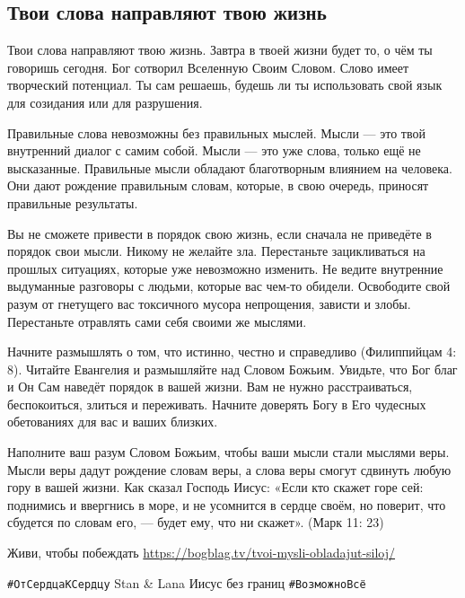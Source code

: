  
 
 
 
 

\subsection{Твои слова направляют твою жизнь}

Твои слова направляют твою жизнь. Завтра в твоей жизни будет то, о чём ты
говоришь сегодня. Бог сотворил Вселенную Своим Словом. Слово имеет творческий
потенциал. Ты сам решаешь, будешь ли ты использовать свой язык для созидания
или для разрушения.

Правильные слова невозможны без правильных мыслей. Мысли — это твой внутренний
диалог с самим собой. Мысли — это уже слова, только ещё не высказанные.
Правильные мысли обладают благотворным влиянием на человека. Они дают рождение
правильным словам, которые, в свою очередь, приносят правильные результаты.

Вы не сможете привести в порядок свою жизнь, если сначала не приведёте в
порядок свои мысли. Никому не желайте зла. Перестаньте зацикливаться на прошлых
ситуациях, которые уже невозможно изменить. Не ведите внутренние выдуманные
разговоры с людьми, которые вас чем-то обидели. Освободите свой разум от
гнетущего вас токсичного мусора непрощения, зависти и злобы. Перестаньте
отравлять сами себя своими же мыслями.

Начните размышлять о том, что истинно, честно и справедливо (Филиппийцам 4: 8).
Читайте Евангелия и размышляйте над Словом Божьим. Увидьте, что Бог благ и Он
Сам наведёт порядок в вашей жизни. Вам не нужно расстраиваться, беспокоиться,
злиться и переживать. Начните доверять Богу в Его чудесных обетованиях для вас
и ваших близких.

Наполните ваш разум Словом Божьим, чтобы ваши мысли стали мыслями веры. Мысли
веры дадут рождение словам веры, а слова веры смогут сдвинуть любую гору в
вашей жизни. Как сказал Господь Иисус: «Если кто скажет горе сей: поднимись и
ввергнись в море, и не усомнится в сердце своём, но поверит, что сбудется по
словам его, — будет ему, что ни скажет». (Марк 11: 23)

Живи, чтобы побеждать \url{https://bogblag.tv/tvoi-mysli-obladajut-siloj/}

\verb|#ОтСердцаКСердцу| Stan \& Lana Иисус без границ \verb|#ВозможноВсё|
